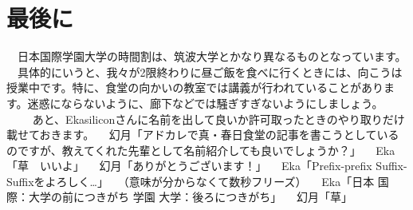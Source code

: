 \documentclass[
paper=a6,
fontsize=7pt,jafontsize=7pt,
baselineskip=1.6zh,
book,
hanging_punctuation,
head_space=10truemm,foot_space=10truemm
]{jlreq}
\begin{document}
\chapter{最後に}
　日本国際学園大学の時間割は、筑波大学とかなり異なるものとなっています。
　具体的にいうと、我々が2限終わりに昼ご飯を食べに行くときには、向こうは授業中です。特に、食堂の向かいの教室では講義が行われていることがあります。迷惑にならないように、廊下などでは騒ぎすぎないようにしましょう。
　
　あと、Ekasiliconさんに名前を出して良いか許可取ったときのやり取りだけ載せておきます。
　幻月「アドカレで真・春日食堂の記事を書こうとしているのですが、教えてくれた先輩として名前紹介しても良いでしょうか？」
　Eka「草　いいよ」
　幻月「ありがとうございます！」
　Eka「Prefix-prefix Suffix-Suffixをよろしく…」
　（意味が分からなくて数秒フリーズ）
　Eka「日本 国際：大学の前につきがち 学園 大学：後ろにつきがち」
　幻月「草」
\end{document}
